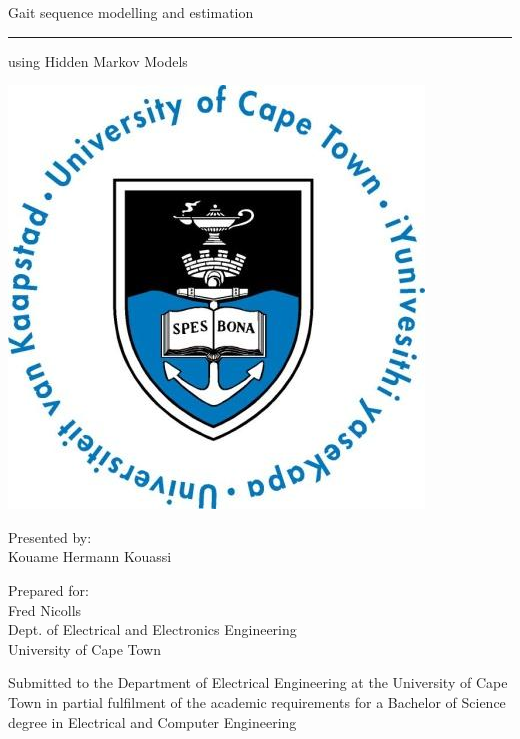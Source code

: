 \documentclass[a4paper,12pt]{report}
\begin{document}
 
\thispagestyle{empty}
{\Huge \begin{center}
Gait sequence modelling and estimation
\hrule 
{\Large using Hidden Markov Models}
\end{center}}

\vskip 5mm
\begin{center}
\- \- \- \- \- \- \- \- \- \-\includegraphics[scale = 0.3]{uctLogo.png}
\end{center}

\vskip 5mm
\begin{center}
Presented by:\\
Kouame Hermann Kouassi		%
\end{center}

\vskip 10mm
\begin{center}
Prepared for:\\
Fred Nicolls\\ 		%
Dept. of Electrical and Electronics Engineering\\University of Cape Town
\end{center}


\vskip 10mm
\begin{center}
Submitted to the Department of Electrical Engineering at the University of Cape Town in partial
fulfilment of the academic requirements for a Bachelor of Science degree in Electrical and Computer Engineering

\end{center}
\end{document}
